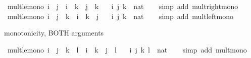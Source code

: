 \begin{isabellebody}
%
\isadelimdocument
%
\endisadelimdocument
%
\isatagdocument
%
\isamarkuptrue%
%
\endisatagdocument
{\isafolddocument}%
%
\isadelimdocument
%
\endisadelimdocument
{}\isamarkupfalse%
\ mult{\isacharunderscore}{\kern0pt}le{\isacharunderscore}{\kern0pt}mono{}{\isacharcolon}{\kern0pt}\ {\isachardoublequoteopen}i\ {\isasymle}\ j\ {\isasymLongrightarrow}\ i\ {\isacharasterisk}{\kern0pt}\ k\ {\isasymle}\ j\ {\isacharasterisk}{\kern0pt}\ k{\isachardoublequoteclose}\isanewline
\ \ \ i\ j\ k\ {\isacharcolon}{\kern0pt}{\isacharcolon}{\kern0pt}\ nat\isanewline
%
\isadelimproof
\ \ %
\endisadelimproof
%
\isatagproof
{}\isamarkupfalse%
\ {\isacharparenleft}{\kern0pt}simp\ add{\isacharcolon}{\kern0pt}\ mult{\isacharunderscore}{\kern0pt}right{\isacharunderscore}{\kern0pt}mono{\isacharparenright}{\kern0pt}%
\endisatagproof
{\isafoldproof}%
%
\isadelimproof
\isanewline
%
\endisadelimproof
\isanewline
{}\isamarkupfalse%
\ mult{\isacharunderscore}{\kern0pt}le{\isacharunderscore}{\kern0pt}mono{}{\isacharcolon}{\kern0pt}\ {\isachardoublequoteopen}i\ {\isasymle}\ j\ {\isasymLongrightarrow}\ k\ {\isacharasterisk}{\kern0pt}\ i\ {\isasymle}\ k\ {\isacharasterisk}{\kern0pt}\ j{\isachardoublequoteclose}\isanewline
\ \ \ i\ j\ k\ {\isacharcolon}{\kern0pt}{\isacharcolon}{\kern0pt}\ nat\isanewline
%
\isadelimproof
\ \ %
\endisadelimproof
%
\isatagproof
{}\isamarkupfalse%
\ {\isacharparenleft}{\kern0pt}simp\ add{\isacharcolon}{\kern0pt}\ mult{\isacharunderscore}{\kern0pt}left{\isacharunderscore}{\kern0pt}mono{\isacharparenright}{\kern0pt}%
\endisatagproof
{\isafoldproof}%
%
\isadelimproof
%
\endisadelimproof
%
\begin{isamarkuptext}%
\isa{{\isasymle}} monotonicity, BOTH arguments%
\end{isamarkuptext}\isamarkuptrue%
\isamarkupfalse%
\ mult{\isacharunderscore}{\kern0pt}le{\isacharunderscore}{\kern0pt}mono{\isacharcolon}{\kern0pt}\ {\isachardoublequoteopen}i\ {\isasymle}\ j\ {\isasymLongrightarrow}\ k\ {\isasymle}\ l\ {\isasymLongrightarrow}\ i\ {\isacharasterisk}{\kern0pt}\ k\ {\isasymle}\ j\ {\isacharasterisk}{\kern0pt}\ l{\isachardoublequoteclose}\isanewline
\ \ \ i\ j\ k\ l\ {\isacharcolon}{\kern0pt}{\isacharcolon}{\kern0pt}\ nat\isanewline
%
\isadelimproof
\ \ %
\endisadelimproof
%
\isatagproof
{}\isamarkupfalse%
\ {\isacharparenleft}{\kern0pt}simp\ add{\isacharcolon}{\kern0pt}\ mult{\isacharunderscore}{\kern0pt}mono{\isacharparenright}{\kern0pt}%

\end{isabellebody}
